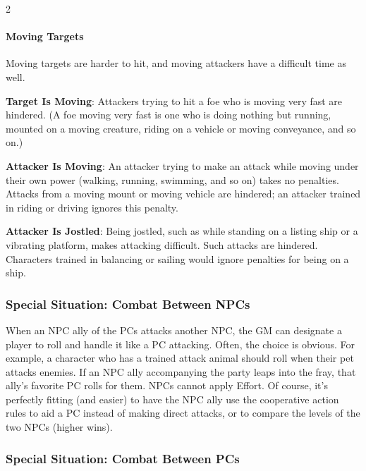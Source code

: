 \begin{multicols}{2}
\paragraph{Moving Targets}

Moving targets are harder to hit, and moving attackers have a difficult time as well.

\textbf{Target Is Moving}: Attackers trying to hit a foe who is moving very fast are hindered. (A foe moving very fast is one who is doing nothing but running, mounted on a moving creature, riding on a vehicle or moving conveyance, and so on.)

\textbf{Attacker Is Moving}: An attacker trying to make an attack while moving under their own power (walking, running, swimming, and so on) takes no penalties. Attacks from a moving mount or moving vehicle are hindered; an attacker trained in riding or driving ignores this penalty.

\textbf{Attacker Is Jostled}: Being jostled, such as while standing on a listing ship or a vibrating platform, makes attacking difficult. Such attacks are hindered. Characters trained in balancing or sailing would ignore penalties for being on a ship.

\subsubsection{Special Situation: Combat Between NPCs} 

When an NPC ally of the PCs attacks another NPC, the GM can designate a player to roll and handle it like a PC attacking. Often, the choice is obvious. For example, a character who has a trained attack animal should roll when their pet attacks enemies. If an NPC ally accompanying the party leaps into the fray, that ally’s favorite PC rolls for them. NPCs cannot apply Effort. Of course, it’s perfectly fitting (and easier) to have the NPC ally use the cooperative action rules to aid a PC instead of making direct attacks, or to compare the levels of the two NPCs (higher wins).

\subsubsection{Special Situation: Combat Between PCs} 


\end{multicols}

